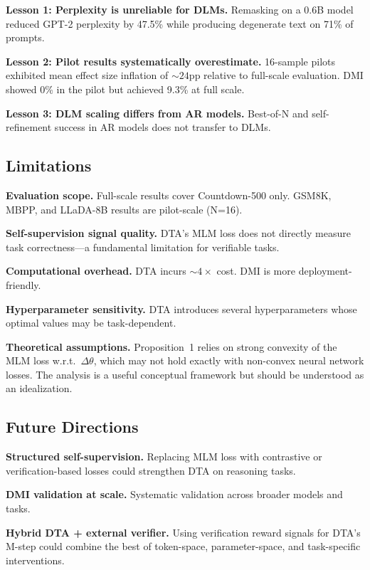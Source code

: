 \documentclass{article}
\begin{document}
\textbf{Lesson 1: Perplexity is unreliable for DLMs.} Remasking on a 0.6B model reduced GPT-2 perplexity by 47.5\% while producing degenerate text on 71\% of prompts.

\textbf{Lesson 2: Pilot results systematically overestimate.} 16-sample pilots exhibited mean effect size inflation of ${\sim}24$pp relative to full-scale evaluation. DMI showed 0\% in the pilot but achieved 9.3\% at full scale.

\textbf{Lesson 3: DLM scaling differs from AR models.} Best-of-N and self-refinement success in AR models does not transfer to DLMs.

\subsection{Limitations}

\textbf{Evaluation scope.} Full-scale results cover Countdown-500 only. GSM8K, MBPP, and LLaDA-8B results are pilot-scale (N=16).

\textbf{Self-supervision signal quality.} DTA's MLM loss does not directly measure task correctness---a fundamental limitation for verifiable tasks.

\textbf{Computational overhead.} DTA incurs ${\sim}4{\times}$ cost. DMI is more deployment-friendly.

\textbf{Hyperparameter sensitivity.} DTA introduces several hyperparameters whose optimal values may be task-dependent.

\textbf{Theoretical assumptions.} Proposition~1 relies on strong convexity of the MLM loss w.r.t.\ $\Delta\theta$, which may not hold exactly with non-convex neural network losses. The analysis is a useful conceptual framework but should be understood as an idealization.

\subsection{Future Directions}

\textbf{Structured self-supervision.} Replacing MLM loss with contrastive or verification-based losses could strengthen DTA on reasoning tasks.

\textbf{DMI validation at scale.} Systematic validation across broader models and tasks.

\textbf{Hybrid DTA + external verifier.} Using verification reward signals for DTA's M-step could combine the best of token-space, parameter-space, and task-specific interventions.
\end{document}
